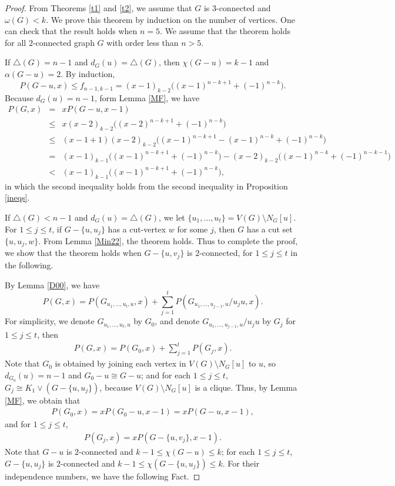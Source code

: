 \documentclass[12pt]{article}
\theoremstyle{definition}
\begin{document}
\begin{proof}  From Theorems \ref{t1} and \ref{t2}, we assume that $G$ is $3$-connected and $\omega(G)<k$. We prove this theorem by induction on the number of vertices. One can check that the result holds when $n=5$. We assume that the theorem holds for all $2$-connected graph $G$ with order less than $n>5$.

If $\triangle(G)=n-1$ and $d_{G}(u)=\triangle(G)$, then $\chi(G-u)=k-1$ and $\alpha(G-u)= 2$. By induction,
$$P(G-u, x)\leq f_{n-1,k-1}=(x-1)_{k-2}\big((x-1)^{n-k+1}+(-1)^{n-k}\big).$$
Because $d_{G}(u)=n-1$, form Lemma \ref{MF}, we have
\begin{eqnarray*}P(G,x)&=&xP(G-u,x-1)\\
&\leq& x(x-2)_{k-2}\big((x-2)^{n-k+1}+(-1)^{n-k}\big)\\
&\leq&(x-1+1)(x-2)_{k-2}\big((x-1)^{n-k+1}-(x-1)^{n-k}+(-1)^{n-k}\big)\\
&=&(x-1)_{k-1}\big((x-1)^{n-k+1}+(-1)^{n-k}\big)-(x-2)_{k-2}\big((x-1)^{n-k}+(-1)^{n-k-1}\big)\\
&<&(x-1)_{k-1}\big((x-1)^{n-k+1}+(-1)^{n-k}\big),
\end{eqnarray*}
in which the second inequality holds from the second inequality in Proposition \ref{ineqs}.

If $\triangle(G)<n-1$ and $d_{G}(u)=\triangle(G)$, we let $\{u_1,\ldots, u_t\}=V(G)\setminus N_{G}[u]$.
For $1\leq j\leq t$, if $G-\{u,u_{j}\}$ has a cut-vertex $w$ for some $j$, then $G$ has a cut set $\{u,u_j,w\}$. From Lemma \ref{Min22}, the theorem holds. Thus to complete the proof, we show that the theorem holds when $G-\{u,v_{j}\}$ is $2$-connected, for $1\leq j\leq t$ in the following.

By Lemma \ref{D00}, we have
$$P(G,x)=P(G_{u_1,\ldots, u_t,u},x)+\sum\limits_{j=1}^{t}P(G_{u_1,\ldots,u_{j-1},u}/u_ju,x).$$
For simplicity, we denote $G_{u_1,\ldots, u_t,u}$ by $G_0$, and denote $G_{u_1,\ldots,u_{j-1},u}/u_ju$ by $G_j$ for $1\leq j\leq t$, then
\begin{eqnarray}\label{s1} P(G,x)=P(G_0,x)+\sum\limits_{j=1}^{t}P(G_j,x).
\end{eqnarray}
Note that $G_0$ is obtained by joining each vertex in $V(G)\setminus N_{G}[u]$ to $u$, so $d_{G_0}(u)=n-1$ and $G_0-u\cong G-u$;
and for each $1\leq j\leq t$, $G_j\cong K_1\vee (G-\{u,u_j\})$, because $V(G)\setminus N_{G}[u]$ is a clique. Thus, by Lemma \ref{MF}, we obtain that
\begin{eqnarray}\label{s2} P(G_0,x)=xP(G_0-u,x-1)=xP(G-u,x-1),
\end{eqnarray}
and for $1\leq j\leq t$,
\begin{eqnarray}\label{s3} P(G_j,x)=xP(G-\{u,v_{j}\},x-1).
\end{eqnarray}
Note that $G-u$ is $2$-connected and $k-1\leq \chi(G-u)\leq k$; for each $1\leq j\leq t$, $G-\{u,u_{j}\}$ is $2$-connected and $k-1\leq \chi(G-\{u,u_{j}\})\leq k$. For their independence numbers, we have the following Fact.


\end{proof}
\end{document}
